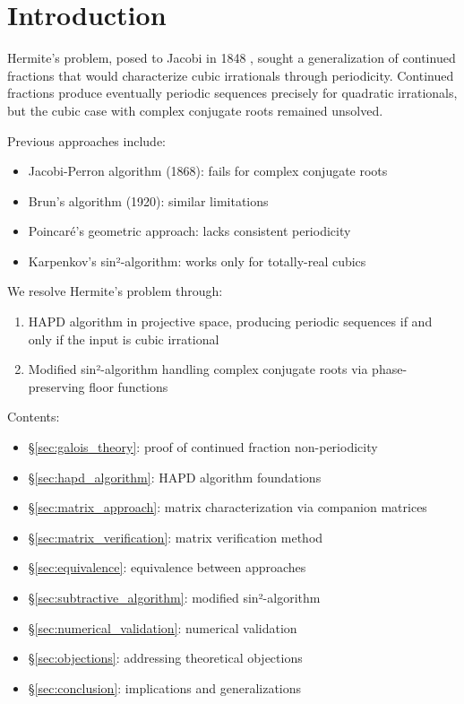 \section{Introduction}\label{sec:intro}

Hermite's problem, posed to Jacobi in 1848 \cite{Hermite1848}, sought a generalization of continued fractions that would characterize cubic irrationals through periodicity. Continued fractions produce eventually periodic sequences precisely for quadratic irrationals, but the cubic case with complex conjugate roots remained unsolved.

Previous approaches include:
\begin{itemize}
\item Jacobi-Perron algorithm (1868): fails for complex conjugate roots
\item Brun's algorithm (1920): similar limitations
\item Poincaré's geometric approach: lacks consistent periodicity
\item Karpenkov's sin²-algorithm: works only for totally-real cubics
\end{itemize}

We resolve Hermite's problem through:
\begin{enumerate}
\item HAPD algorithm in projective space, producing periodic sequences if and only if the input is cubic irrational
\item Modified sin²-algorithm handling complex conjugate roots via phase-preserving floor functions
\end{enumerate}

Contents:
\begin{itemize}
\item \S\ref{sec:galois_theory}: proof of continued fraction non-periodicity
\item \S\ref{sec:hapd_algorithm}: HAPD algorithm foundations
\item \S\ref{sec:matrix_approach}: matrix characterization via companion matrices
\item \S\ref{sec:matrix_verification}: matrix verification method
\item \S\ref{sec:equivalence}: equivalence between approaches
\item \S\ref{sec:subtractive_algorithm}: modified sin²-algorithm
\item \S\ref{sec:numerical_validation}: numerical validation
\item \S\ref{sec:objections}: addressing theoretical objections
\item \S\ref{sec:conclusion}: implications and generalizations
\end{itemize}
